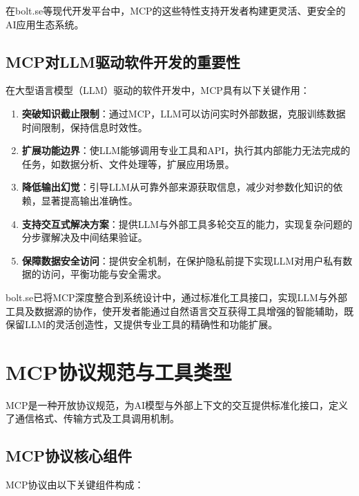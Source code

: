 在bolt.se等现代开发平台中，MCP的这些特性支持开发者构建更灵活、更安全的AI应用生态系统。

\subsection{MCP对LLM驱动软件开发的重要性}
在大型语言模型（LLM）驱动的软件开发中，MCP具有以下关键作用：

\begin{enumerate}
  \item \textbf{突破知识截止限制}：通过MCP，LLM可以访问实时外部数据，克服训练数据时间限制，保持信息时效性。
  
  \item \textbf{扩展功能边界}：使LLM能够调用专业工具和API，执行其内部能力无法完成的任务，如数据分析、文件处理等，扩展应用场景。
  
  \item \textbf{降低输出幻觉}：引导LLM从可靠外部来源获取信息，减少对参数化知识的依赖，显著提高输出准确性。
  
  \item \textbf{支持交互式解决方案}：提供LLM与外部工具多轮交互的能力，实现复杂问题的分步骤解决及中间结果验证。
  
  \item \textbf{保障数据安全访问}：提供安全机制，在保护隐私前提下实现LLM对用户私有数据的访问，平衡功能与安全需求。
\end{enumerate}

bolt.se已将MCP深度整合到系统设计中，通过标准化工具接口，实现LLM与外部工具及数据源的协作，使开发者能通过自然语言交互获得工具增强的智能辅助，既保留LLM的灵活创造性，又提供专业工具的精确性和功能扩展。

\section{MCP协议规范与工具类型}

MCP是一种开放协议规范，为AI模型与外部上下文的交互提供标准化接口，定义了通信格式、传输方式及工具调用机制\cite{mcpspec2023}。

\subsection{MCP协议核心组件}

MCP协议由以下关键组件构成：

